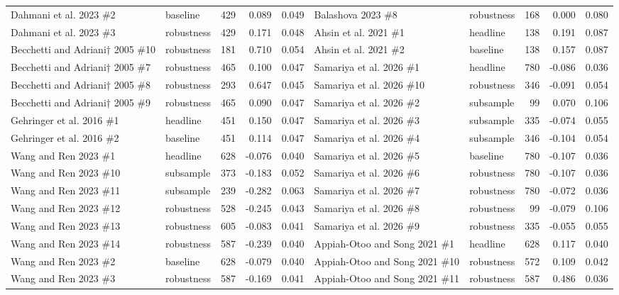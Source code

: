 {\begin{longtable}{@{}p{3.0cm} l r r r@{\hspace{0.8em}}p{3.0cm} l r r r@{}}
Dahmani et al. 2023 \#2 & baseline & 429 & 0.089 & 0.049 & Balashova 2023 \#8 & robustness & 168 & 0.000 & 0.080 \\
Dahmani et al. 2023 \#3 & robustness & 429 & 0.171 & 0.048 & Ahsin et al. 2021 \#1 & headline & 138 & 0.191 & 0.087 \\
Becchetti and Adriani† 2005 \#10 & robustness & 181 & 0.710 & 0.054 & Ahsin et al. 2021 \#2 & baseline & 138 & 0.157 & 0.087 \\
Becchetti and Adriani† 2005 \#7 & robustness & 465 & 0.100 & 0.047 & Samariya et al. 2026 \#1 & headline & 780 & -0.086 & 0.036 \\
Becchetti and Adriani† 2005 \#8 & robustness & 293 & 0.647 & 0.045 & Samariya et al. 2026 \#10 & robustness & 346 & -0.091 & 0.054 \\
Becchetti and Adriani† 2005 \#9 & robustness & 465 & 0.090 & 0.047 & Samariya et al. 2026 \#2 & subsample & 99 & 0.070 & 0.106 \\
Gehringer et al. 2016 \#1 & headline & 451 & 0.150 & 0.047 & Samariya et al. 2026 \#3 & subsample & 335 & -0.074 & 0.055 \\
Gehringer et al. 2016 \#2 & baseline & 451 & 0.114 & 0.047 & Samariya et al. 2026 \#4 & subsample & 346 & -0.104 & 0.054 \\
Wang and Ren 2023 \#1 & headline & 628 & -0.076 & 0.040 & Samariya et al. 2026 \#5 & baseline & 780 & -0.107 & 0.036 \\
Wang and Ren 2023 \#10 & subsample & 373 & -0.183 & 0.052 & Samariya et al. 2026 \#6 & robustness & 780 & -0.107 & 0.036 \\
Wang and Ren 2023 \#11 & subsample & 239 & -0.282 & 0.063 & Samariya et al. 2026 \#7 & robustness & 780 & -0.072 & 0.036 \\
Wang and Ren 2023 \#12 & robustness & 528 & -0.245 & 0.043 & Samariya et al. 2026 \#8 & robustness & 99 & -0.079 & 0.106 \\
Wang and Ren 2023 \#13 & robustness & 605 & -0.083 & 0.041 & Samariya et al. 2026 \#9 & robustness & 335 & -0.055 & 0.055 \\
Wang and Ren 2023 \#14 & robustness & 587 & -0.239 & 0.040 & Appiah-Otoo and Song 2021 \#1 & headline & 628 & 0.117 & 0.040 \\
Wang and Ren 2023 \#2 & baseline & 628 & -0.079 & 0.040 & Appiah-Otoo and Song 2021 \#10 & robustness & 572 & 0.109 & 0.042 \\
Wang and Ren 2023 \#3 & robustness & 587 & -0.169 & 0.041 & Appiah-Otoo and Song 2021 \#11 & robustness & 587 & 0.486 & 0.036 \\

\end{longtable}}
